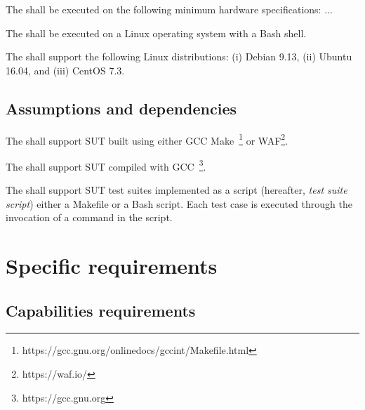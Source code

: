\RQ{} The \FAQAS shall be executed on the following minimum hardware specifications: ...

\RQ{} The \FAQAS shall be executed on a Linux operating system with a Bash shell.

\RQ{} The \FAQAS shall support the following Linux distributions: (i) Debian 9.13, (ii) Ubuntu 16.04, and (iii) CentOS 7.3.


\subsection{Assumptions and dependencies}

\RQ{} The \FAQAS shall support SUT built using either GCC Make~\footnote{https://gcc.gnu.org/onlinedocs/gccint/Makefile.html} or WAF\footnote{https://waf.io/}.

\RQ{} The \FAQAS shall support SUT compiled with GCC~\footnote{https://gcc.gnu.org}.


\RQ{} The \FAQAS shall support SUT test suites implemented as a script (hereafter, \emph{test suite script}) either a Makefile or a Bash script. Each test case is executed through the invocation of a command in the script.

\section{Specific requirements}
\subsection{Capabilities requirements}
\label{sec:rquirements:capabilities}



